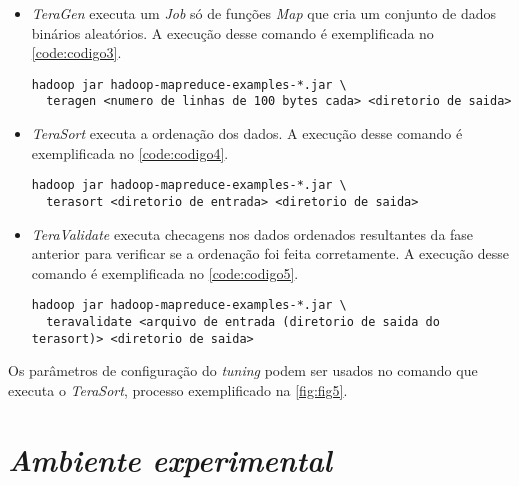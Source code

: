 \begin{itemize}
  \item \textit{TeraGen} executa um \textit{Job} só de funções \textit{Map} que cria um conjunto de dados binários aleatórios. A execução desse comando é exemplificada no \autoref{code:codigo3}.
  
  \begin{lstlisting}[caption={Exemplo de execução do \textit{TeraGen} adaptado de \cite{HadoopBook15}}, label=code:codigo3]
  hadoop jar hadoop-mapreduce-examples-*.jar \
  teragen <numero de linhas de 100 bytes cada> <diretorio de saida>
  \end{lstlisting}
  
  \item \textit{TeraSort} executa a ordenação dos dados. A execução desse comando é exemplificada no \autoref{code:codigo4}.
  \begin{lstlisting}[caption={Exemplo de execução do \textit{TeraSor} adaptado de \cite{HadoopBook15}}, label=code:codigo4]
  hadoop jar hadoop-mapreduce-examples-*.jar \
  terasort <diretorio de entrada> <diretorio de saida>
  \end{lstlisting}  

  \item \textit{TeraValidate} executa checagens nos dados ordenados resultantes da fase anterior para verificar se a ordenação foi feita corretamente. A execução desse comando é exemplificada no \autoref{code:codigo5}.
  \begin{lstlisting}[caption={Exemplo de execução do \textit{TeraValidate} adaptado de \cite{HadoopBook15}}, label=code:codigo5]
  hadoop jar hadoop-mapreduce-examples-*.jar \
  teravalidate <arquivo de entrada (diretorio de saida do terasort)> <diretorio de saida>
  \end{lstlisting}

\end{itemize}

Os parâmetros de configuração do \textit{tuning} podem ser usados no comando que executa o \textit{TeraSort}, processo exemplificado na \autoref{fig:fig5}.


\section{\textit{Ambiente experimental}} \label{sec:ambienteexperimental}


